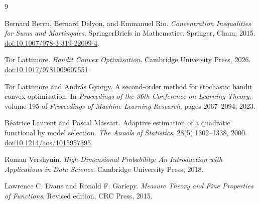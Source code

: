\documentclass[11pt]{article}
\newcommand{\1}{\mathbf 1}
\begin{document}
\newpage
\begin{thebibliography}{9}
    \raggedright

    Bernard Bercu, Bernard Delyon, and Emmanuel Rio.
    \newblock \emph{Concentration Inequalities for Sums and Martingales}.
    \newblock SpringerBriefs in Mathematics. Springer, Cham, 2015.
    \newblock \href{https://doi.org/10.1007/978-3-319-22099-4}
    {doi:10.1007/978-3-319-22099-4}.

    Tor Lattimore.
    \newblock \emph{Bandit Convex Optimisation}.
    \newblock Cambridge University Press, 2026.
    \newblock \href{https://doi.org/10.1017/9781009607551}{doi:10.1017/9781009607551}.

    Tor Lattimore and Andr\'as Gy\"orgy.
    \newblock A second-order method for stochastic bandit convex optimisation.
    \newblock In \emph{Proceedings of the 36th Conference on Learning Theory},
    volume 195 of \emph{Proceedings of Machine Learning Research}, pages
    2067--2094, 2023.

    B\'eatrice Laurent and Pascal Massart.
    \newblock Adaptive estimation of a quadratic functional by model selection.
    \newblock \emph{The Annals of Statistics}, 28(5):1302--1338, 2000.
    \newblock \href{https://doi.org/10.1214/aos/1015957395}
    {doi:10.1214/aos/1015957395}.

    Roman Vershynin.
    \newblock \emph{High-Dimensional Probability: An Introduction with
        Applications in Data Science}.
    \newblock Cambridge University Press, 2018.


    Lawrence C. Evans and Ronald F. Gariepy.
    \newblock \emph{Measure Theory and Fine Properties of Functions}.
    \newblock Revised edition, CRC Press, 2015.

\end{thebibliography}

\newpage
\appendix
\end{document}
